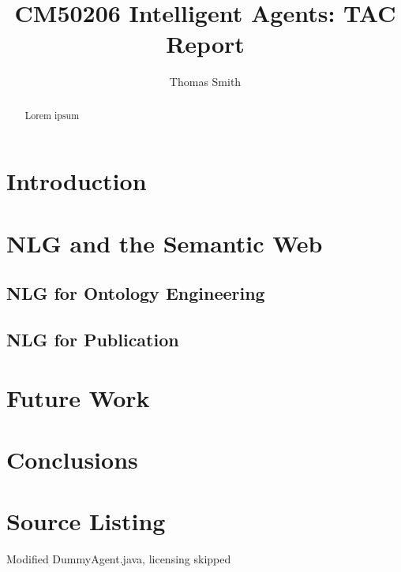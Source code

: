 \documentclass[oribibl]{llncs}
\begin{document}
\title{CM50206 Intelligent Agents: TAC Report}


\author{Thomas Smith}
\maketitle

\begin{abstract}
Lorem ipsum\cite{greenwald2009roxybot}
\end{abstract}

\section{Introduction}
\cite{wellman2003price}

\section{NLG and the Semantic Web}


\subsection{NLG for Ontology Engineering}


\subsection{NLG for Publication}


\section{Future Work}

\section{Conclusions}

\newpage



\newpage
\appendix
\section{Source Listing}
Modified DummyAgent.java, licensing skipped

\end{document}
